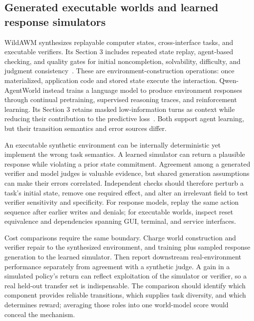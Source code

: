 \subsection{Generated executable worlds and learned response simulators}
\label{sec:C06:worldsynthesis}
WildAWM synthesizes replayable computer states, cross-interface tasks, and executable verifiers. Its Section 3 includes repeated state replay, agent-based checking, and quality gates for initial noncompletion, solvability, difficulty, and judgment consistency~\cite{rewrite_wildawm2026}. These are environment-construction operations: once materialized, application code and stored state execute the interaction. Qwen-AgentWorld instead trains a language model to produce environment responses through continual pretraining, supervised reasoning traces, and reinforcement learning. Its Section 3 retains masked low-information turns as context while reducing their contribution to the predictive loss~\cite{rewrite_qwenworld2026}. Both support agent learning, but their transition semantics and error sources differ.

An executable synthetic environment can be internally deterministic yet implement the wrong task semantics. A learned simulator can return a plausible response while violating a prior state commitment. Agreement among a generated verifier and model judges is valuable evidence, but shared generation assumptions can make their errors correlated. Independent checks should therefore perturb a task's initial state, remove one required effect, and alter an irrelevant field to test verifier sensitivity and specificity. For response models, replay the same action sequence after earlier writes and denials; for executable worlds, inspect reset equivalence and dependencies spanning GUI, terminal, and service interfaces.

Cost comparisons require the same boundary. Charge world construction and verifier repair to the synthesized environment, and training plus sampled response generation to the learned simulator. Then report downstream real-environment performance separately from agreement with a synthetic judge. A gain in a simulated policy's return can reflect exploitation of the simulator or verifier, so a real held-out transfer set is indispensable. The comparison should identify which component provides reliable transitions, which supplies task diversity, and which determines reward; averaging those roles into one world-model score would conceal the mechanism.



